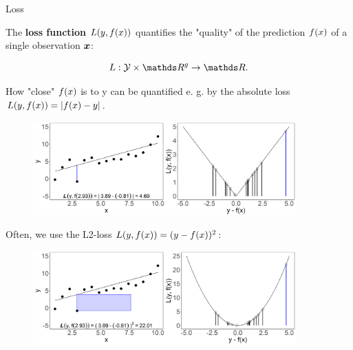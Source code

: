 \documentclass[11pt,compress,t,notes=noshow, xcolor=table]{beamer}
\begin{document}
\begin{vbframe}{Loss}

The \textbf{loss function} $L(y, f(x))$ quantifies the "quality" of the prediction $f(x)$ of a single observation $\bm{x}$:

    $$
    L: \Yspace \times \R^g \to \R.
    $$

\lz

How "close" $f(x)$ is to y can be quantified e. g. by the absolute loss $L(y, f(x)) = |f(x) - y|$.


\vfill


\begin{center}
\begin{figure}[!b]
\includegraphics[width=0.9\textwidth]{figure/ml-basic_riskmin-1-loss_abs.png}
\end{figure}
\end{center}

\framebreak

Often, we use the L2-loss $L(y, f(x)) = (y - f(x))^2$:

\begin{center}
\begin{figure}[!b]
\includegraphics[width=0.9\textwidth]{figure/ml-basic_riskmin-1-loss_sqrd.png}
\end{figure}
\end{center}



\end{vbframe}
\end{document}
